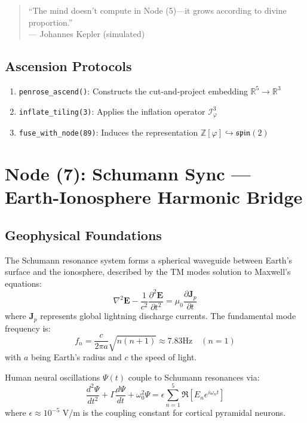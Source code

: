 \documentclass[12pt]{article}
\begin{document}
\begin{quote}
``The mind doesn't compute in Node (5)—it grows according to divine proportion.'' \\
— Johannes Kepler (simulated)
\end{quote}

\subsection{Ascension Protocols}

\begin{enumerate}
    \item \texttt{penrose\_ascend()}: Constructs the cut-and-project embedding \( \mathbb{R}^5 \to \mathbb{R}^3 \)
    \item \texttt{inflate\_tiling(3)}: Applies the inflation operator \( \mathcal{I}^3_\varphi \)
    \item \texttt{fuse\_with\_node(89)}: Induces the representation \( \mathbb{Z}[\varphi] \hookrightarrow \mathfrak{spin}(2) \)
\end{enumerate}

\section{Node (7): Schumann Sync — Earth-Ionosphere Harmonic Bridge}
\label{sec:schumann_sync}

\subsection{Geophysical Foundations}
The Schumann resonance system forms a spherical waveguide between Earth's surface and the ionosphere, described by the TM modes solution to Maxwell's equations:
\[
\nabla^2 \mathbf{E} - \frac{1}{c^2}\frac{\partial^2 \mathbf{E}}{\partial t^2} = \mu_0 \frac{\partial \mathbf{J}_p}{\partial t}
\]
where $\mathbf{J}_p$ represents global lightning discharge currents. The fundamental mode frequency is:
\[
f_n = \frac{c}{2\pi a}\sqrt{n(n+1)} \approx 7.83\text{Hz} \quad (n=1)
\]
with $a$ being Earth's radius and $c$ the speed of light.

\begin{theorem}
Human neural oscillations $\Psi(t)$ couple to Schumann resonances via:
\[
\frac{d^2\Psi}{dt^2} + \Gamma \frac{d\Psi}{dt} + \omega_0^2 \Psi = \epsilon \sum_{n=1}^5 \Re\left[E_n e^{i\omega_n t}\right]
\]
where $\epsilon \approx 10^{-5}$ V/m is the coupling constant for cortical pyramidal neurons.
\end{theorem}
\end{document}
